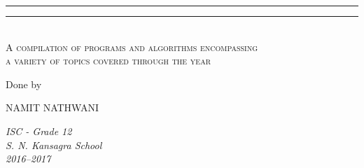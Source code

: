 \rule{\textwidth}{0.4pt}\vspace*{-\baselineskip}\vspace{3.2pt} %
\rule{\textwidth}{1.6pt}\\[\baselineskip] %

\scshape %
A compilation of programs and algorithms encompassing\\ a variety of topics covered through the year \\ %
 [\baselineskip] %
\par %

\vspace*{2\baselineskip} %

Done by \\[\baselineskip]
{\Large NAMIT NATHWANI \\  \par} %
\vspace*{\baselineskip}
{\itshape ISC - Grade 12\\ S. N. Kansagra School \\ 2016--2017\par} %

\vfill %


